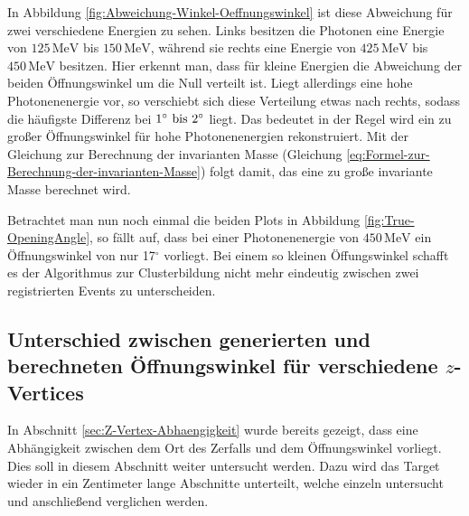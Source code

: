 \documentclass[a4paper,11pt,oneside,final,german,openbib,pdftex]{scrbook}
\begin{document}
{In Abbildung \ref{fig:Abweichung-Winkel-Oeffnungswinkel} ist diese Abweichung f\"ur zwei verschiedene Energien zu sehen. Links besitzen die Photonen eine Energie von $125\,\text{MeV}$ bis $150\,\text{MeV}$, w\"ahrend sie rechts eine Energie von $425\,\text{MeV}$ bis $450\,\text{MeV}$ besitzen. Hier erkennt man, dass f\"ur kleine Energien die Abweichung der beiden \"Offnungswinkel um die Null verteilt ist. Liegt allerdings eine hohe Photonenenergie vor, so verschiebt sich diese Verteilung etwas nach rechts, sodass die h\"aufigste Differenz bei $1^{\circ} \textnormal{ bis } 2^{\circ}$ liegt. Das bedeutet in der Regel wird ein zu gro{\ss}er \"Offnungswinkel f\"ur hohe Photonenenergien rekonstruiert. Mit der Gleichung zur Berechnung der invarianten Masse (Gleichung \ref{eq:Formel-zur-Berechnung-der-invarianten-Masse}) folgt damit, das eine zu gro{\ss}e invariante Masse berechnet wird.

Betrachtet man nun noch einmal die beiden Plots in Abbildung \ref{fig:True-OpeningAngle}, so f\"allt auf, dass bei einer Photonenenergie von $450\,\text{MeV}$ ein \"Offnungswinkel von nur 17$^{\circ}$ vorliegt. Bei einem so kleinen \"Offungswinkel schafft es der Algorithmus zur Clusterbildung nicht mehr eindeutig zwischen zwei registrierten Events zu unterscheiden. 





 
 


\subsection{Unterschied zwischen generierten und berechneten \"Offnungswinkel f\"ur verschiedene $z$-Vertices}
\label{sec:Unterschied-Oeffnungswinkel-ZVertex}

In Abschnitt \ref{sec:Z-Vertex-Abhaengigkeit} wurde bereits gezeigt, dass eine Abh\"angigkeit zwischen dem Ort des Zerfalls und dem \"Offnungswinkel vorliegt. Dies soll in diesem Abschnitt weiter untersucht werden. Dazu wird das Target wieder in ein Zentimeter lange Abschnitte unterteilt, welche einzeln untersucht und anschlie{\ss}end verglichen werden.

}
\end{document}
